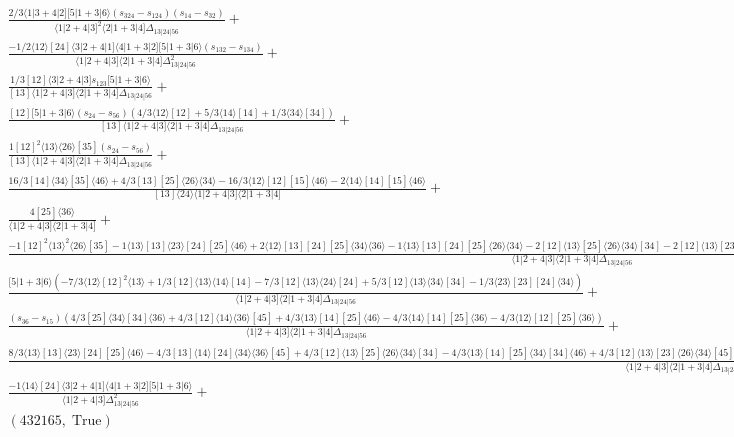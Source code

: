\documentclass[varwidth, border=5pt]{standalone}
\begin{document}
\begin{my}
$\begin{gathered}
\scriptscriptstyle\frac{2/3⟨1|3+4|2][5|1+3|6⟩(s_{324}-s_{124})(s_{14}-s_{32})}{⟨1|2+4|3]^2⟨2|1+3|4]Δ_{13|24|56}}+\\
\scriptscriptstyle\frac{-1/2⟨12⟩[24]⟨3|2+4|1]⟨4|1+3|2][5|1+3|6⟩(s_{132}-s_{134})}{⟨1|2+4|3]⟨2|1+3|4]Δ_{13|24|56}^2}+\\
\scriptscriptstyle\frac{1/3[12]⟨3|2+4|3]s_{123}[5|1+3|6⟩}{[13]⟨1|2+4|3]⟨2|1+3|4]Δ_{13|24|56}}+\\
\scriptscriptstyle\frac{[12][5|1+3|6⟩(s_{24}-s_{56})(4/3⟨12⟩[12]+5/3⟨14⟩[14]+1/3⟨34⟩[34])}{[13]⟨1|2+4|3]⟨2|1+3|4]Δ_{13|24|56}}+\\
\scriptscriptstyle\frac{1[12]^2⟨13⟩⟨26⟩[35](s_{24}-s_{56})}{[13]⟨1|2+4|3]⟨2|1+3|4]Δ_{13|24|56}}+\\
\scriptscriptstyle\frac{16/3[14]⟨34⟩[35]⟨46⟩+4/3[13][25]⟨26⟩⟨34⟩-16/3⟨12⟩[12][15]⟨46⟩-2⟨14⟩[14][15]⟨46⟩}{[13]⟨24⟩⟨1|2+4|3]⟨2|1+3|4]}+\\
\scriptscriptstyle\frac{4[25]⟨36⟩}{⟨1|2+4|3]⟨2|1+3|4]}+\\
\scriptscriptstyle\frac{-1[12]^2⟨13⟩^2⟨26⟩[35]-1⟨13⟩[13]⟨23⟩[24][25]⟨46⟩+2⟨12⟩[13][24][25]⟨34⟩⟨36⟩-1⟨13⟩[13][24][25]⟨26⟩⟨34⟩-2[12]⟨13⟩[25]⟨26⟩⟨34⟩[34]-2[12]⟨13⟩[23]⟨26⟩⟨34⟩[45]+1/2⟨14⟩^2[14]^2[25]⟨36⟩-1⟨12⟩^2[12]^2[25]⟨36⟩+1/2⟨23⟩^2[23]^2[25]⟨36⟩}{⟨1|2+4|3]⟨2|1+3|4]Δ_{13|24|56}}+\\
\scriptscriptstyle\frac{[5|1+3|6⟩(-7/3⟨12⟩[12]^2⟨13⟩+1/3[12]⟨13⟩⟨14⟩[14]-7/3[12]⟨13⟩⟨24⟩[24]+5/3[12]⟨13⟩⟨34⟩[34]-1/3⟨23⟩[23][24]⟨34⟩)}{⟨1|2+4|3]⟨2|1+3|4]Δ_{13|24|56}}+\\
\scriptscriptstyle\frac{(s_{36}-s_{15})(4/3[25]⟨34⟩[34]⟨36⟩+4/3[12]⟨14⟩⟨36⟩[45]+4/3⟨13⟩[14][25]⟨46⟩-4/3⟨14⟩[14][25]⟨36⟩-4/3⟨12⟩[12][25]⟨36⟩)}{⟨1|2+4|3]⟨2|1+3|4]Δ_{13|24|56}}+\\
\scriptscriptstyle\frac{8/3⟨13⟩[13]⟨23⟩[24][25]⟨46⟩-4/3[13]⟨14⟩[24]⟨34⟩⟨36⟩[45]+4/3[12]⟨13⟩[25]⟨26⟩⟨34⟩[34]-4/3⟨13⟩[14][25]⟨34⟩[34]⟨46⟩+4/3[12]⟨13⟩[23]⟨26⟩⟨34⟩[45]+4/3[12]⟨14⟩^2[14]⟨36⟩[45]-4/3⟨14⟩^2[14]^2[25]⟨36⟩-4/3⟨12⟩^2[12]^2[25]⟨36⟩-4/3⟨23⟩^2[23]^2[25]⟨36⟩-8/3⟨23⟩[23][25]⟨34⟩[34]⟨36⟩}{⟨1|2+4|3]⟨2|1+3|4]Δ_{13|24|56}}+\\
\scriptscriptstyle\frac{-1⟨14⟩[24]⟨3|2+4|1]⟨4|1+3|2][5|1+3|6⟩}{⟨1|2+4|3]Δ_{13|24|56}^2}+\\
\scriptscriptstyle(432165,\;\text{True})\phantom{+}
\end{gathered}$
\end{my}
\end{document}

